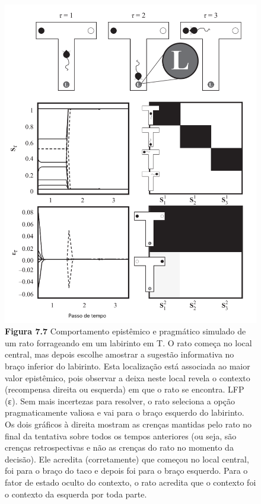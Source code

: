 \documentclass[
  12pt,
]{book}
\begin{document}
\begin{figure}
\centering
\includegraphics{images/Figura_7_7.png}
\caption{\textbf{Figura 7.7} Comportamento epistêmico e pragmático simulado de um rato forrageando em um labirinto em T. O rato começa no local central, mas depois escolhe amostrar a sugestão informativa no braço inferior do labirinto. Esta localização está associada ao maior valor epistêmico, pois observar a deixa neste local revela o contexto (recompensa direita ou esquerda) em que o rato se encontra. LFP (ε ). Sem mais incertezas para resolver, o rato seleciona a opção pragmaticamente valiosa e vai para o braço esquerdo do labirinto. Os dois gráficos à direita mostram as crenças mantidas pelo rato no final da tentativa sobre todos os tempos anteriores (ou seja, são crenças retrospectivas e não as crenças do rato no momento da decisão). Ele acredita (corretamente) que começou no local central, foi para o braço do taco e depois foi para o braço esquerdo. Para o fator de estado oculto do contexto, o rato acredita que o contexto foi o contexto da esquerda por toda parte.}
\end{figure}
\end{document}

